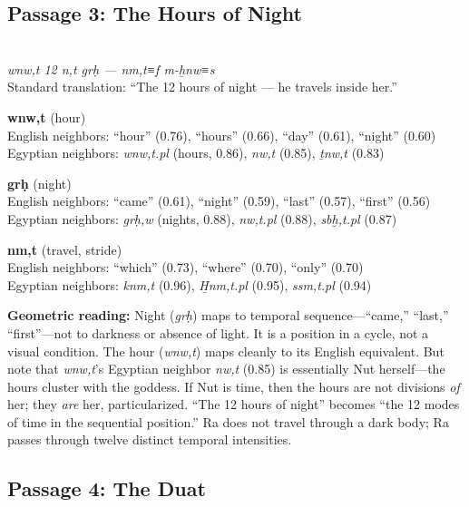 \documentclass[11pt, a4paper]{article}
\newcommand{\passagehiero}[1]{{\normalfont\hierofont\fontsize{14}{17}\selectfont #1}}
\begin{document}
\subsection{Passage 3: The Hours of Night}

{\color{passage}\passagehiero{𓃹𓈖𓏌𓏏𓇼 12 𓈖𓏏 𓎼𓂋𓎛 --- 𓈖𓅓𓏏𓆑 𓅓𓄚𓈖𓉐𓊃}\\\medskip
\textit{\small wnw,t 12 n,t grḥ --- nm,t≡f m-ẖnw≡s}\\
Standard translation: ``The 12 hours of night --- he travels inside her.''}

\bigskip

\noindent\textbf{wnw,t} (hour)\\
English neighbors: ``hour'' (0.76), ``hours'' (0.66), ``day'' (0.61), ``night'' (0.60)\\
Egyptian neighbors: \textit{wnw,t.pl} (hours, 0.86), \textit{nw,t} (0.85), \textit{ṯnw,t} (0.83)

\medskip

\noindent\textbf{grḥ} (night)\\
English neighbors: ``came'' (0.61), ``night'' (0.59), ``last'' (0.57), ``first'' (0.56)\\
Egyptian neighbors: \textit{grḥ,w} (nights, 0.88), \textit{nw,t.pl} (0.88), \textit{sbḫ,t.pl} (0.87)

\medskip

\noindent\textbf{nm,t} (travel, stride)\\
English neighbors: ``which'' (0.73), ``where'' (0.70), ``only'' (0.70)\\
Egyptian neighbors: \textit{knm,t} (0.96), \textit{H̱nm,t.pl} (0.95), \textit{ssm,t.pl} (0.94)

\medskip

{\color{insight}\textbf{Geometric reading:}} Night (\textit{grḥ}) maps to temporal sequence---``came,'' ``last,'' ``first''---not to darkness or absence of light. It is a position in a cycle, not a visual condition. The hour (\textit{wnw,t}) maps cleanly to its English equivalent. But note that \textit{wnw,t}'s Egyptian neighbor \textit{nw,t} (0.85) is essentially Nut herself---the hours cluster with the goddess. If Nut is time, then the hours are not divisions \textit{of} her; they \textit{are} her, particularized. ``The 12 hours of night'' becomes ``the 12 modes of time in the sequential position.'' Ra does not travel through a dark body; Ra passes through twelve distinct temporal intensities.

\subsection{Passage 4: The Duat}
\end{document}
